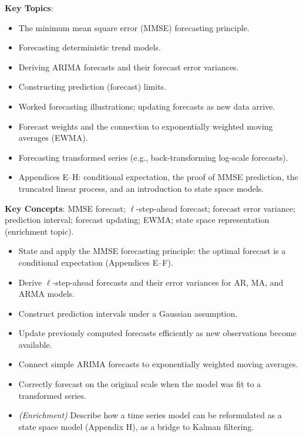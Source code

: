 \documentclass[11pt]{article}
\newcommand{\keytopics}{\textbf{\color{modblue}Key Topics}}
\newcommand{\keyconcepts}{\textbf{\color{modblue}Key Concepts}}
\begin{document}
\keytopics:
\begin{itemize}
  \item The minimum mean square error (MMSE) forecasting principle.
  \item Forecasting deterministic trend models.
  \item Deriving ARIMA forecasts and their forecast error variances.
  \item Constructing prediction (forecast) limits.
  \item Worked forecasting illustrations; updating forecasts as new data arrive.
  \item Forecast weights and the connection to exponentially weighted moving averages (EWMA).
  \item Forecasting transformed series (e.g., back-transforming log-scale forecasts).
  \item Appendices E--H: conditional expectation, the proof of MMSE prediction, the truncated linear process, and an introduction to state space models.
\end{itemize}

\keyconcepts: MMSE forecast; $\ell$-step-ahead forecast; forecast error variance; prediction interval; forecast updating; EWMA; state space representation (enrichment topic).

\begin{objectives}
\begin{itemize}
  \item State and apply the MMSE forecasting principle: the optimal forecast is a conditional expectation (Appendices E--F).
  \item Derive $\ell$-step-ahead forecasts and their error variances for AR, MA, and ARMA models.
  \item Construct prediction intervals under a Gaussian assumption.
  \item Update previously computed forecasts efficiently as new observations become available.
  \item Connect simple ARIMA forecasts to exponentially weighted moving averages.
  \item Correctly forecast on the original scale when the model was fit to a transformed series.
  \item \emph{(Enrichment)} Describe how a time series model can be reformulated as a state space model (Appendix H), as a bridge to Kalman filtering.
\end{itemize}
\end{objectives}
\end{document}

